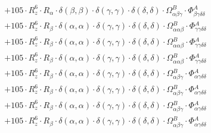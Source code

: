 \documentclass{article}
\begin{document}
\begin{subequations}
\begin{gather}
\begin{array}{c}
 \\[0.2em] 		 + 105 \cdot R_{z}^{6} \cdot R_{\alpha{}} \cdot \delta{}\left(\beta{}, \beta{}\right) \cdot \delta{}\left(\gamma{}, \gamma{}\right) \cdot \delta{}\left(\delta{}, \delta{}\right) \cdot \Omega{}^{B}_{\alpha{}\beta{}\gamma{}} \cdot \Phi{}^{A}_{\beta{}\gamma{}\delta{}\delta{}} 
 \\[0.2em] 		 + 105 \cdot R_{z}^{6} \cdot R_{\beta{}} \cdot \delta{}\left(\alpha{}, \alpha{}\right) \cdot \delta{}\left(\gamma{}, \gamma{}\right) \cdot \delta{}\left(\delta{}, \delta{}\right) \cdot \Omega{}^{B}_{\alpha{}\alpha{}\beta{}} \cdot \Phi{}^{A}_{\gamma{}\gamma{}\delta{}\delta{}} 
 \\[0.2em] 		 + 105 \cdot R_{z}^{6} \cdot R_{\beta{}} \cdot \delta{}\left(\alpha{}, \alpha{}\right) \cdot \delta{}\left(\gamma{}, \gamma{}\right) \cdot \delta{}\left(\delta{}, \delta{}\right) \cdot \Omega{}^{B}_{\alpha{}\alpha{}\beta{}} \cdot \Phi{}^{A}_{\gamma{}\gamma{}\delta{}\delta{}} 
 \\[0.2em] 		 + 105 \cdot R_{z}^{6} \cdot R_{\beta{}} \cdot \delta{}\left(\alpha{}, \alpha{}\right) \cdot \delta{}\left(\gamma{}, \gamma{}\right) \cdot \delta{}\left(\delta{}, \delta{}\right) \cdot \Omega{}^{B}_{\alpha{}\alpha{}\beta{}} \cdot \Phi{}^{A}_{\gamma{}\gamma{}\delta{}\delta{}} 
 \\[0.2em] 		 + 105 \cdot R_{z}^{6} \cdot R_{\beta{}} \cdot \delta{}\left(\alpha{}, \alpha{}\right) \cdot \delta{}\left(\gamma{}, \gamma{}\right) \cdot \delta{}\left(\delta{}, \delta{}\right) \cdot \Omega{}^{B}_{\alpha{}\beta{}\gamma{}} \cdot \Phi{}^{A}_{\alpha{}\gamma{}\delta{}\delta{}} 
 \\[0.2em] 		 + 105 \cdot R_{z}^{6} \cdot R_{\beta{}} \cdot \delta{}\left(\alpha{}, \alpha{}\right) \cdot \delta{}\left(\gamma{}, \gamma{}\right) \cdot \delta{}\left(\delta{}, \delta{}\right) \cdot \Omega{}^{B}_{\alpha{}\beta{}\gamma{}} \cdot \Phi{}^{A}_{\alpha{}\gamma{}\delta{}\delta{}} 
 \\[0.2em] 		 + 105 \cdot R_{z}^{6} \cdot R_{\beta{}} \cdot \delta{}\left(\alpha{}, \alpha{}\right) \cdot \delta{}\left(\gamma{}, \gamma{}\right) \cdot \delta{}\left(\delta{}, \delta{}\right) \cdot \Omega{}^{B}_{\alpha{}\beta{}\gamma{}} \cdot \Phi{}^{A}_{\alpha{}\gamma{}\delta{}\delta{}} 
 \\[0.2em] 		 + 105 \cdot R_{z}^{6} \cdot R_{\beta{}} \cdot \delta{}\left(\alpha{}, \alpha{}\right) \cdot \delta{}\left(\gamma{}, \gamma{}\right) \cdot \delta{}\left(\delta{}, \delta{}\right) \cdot \Omega{}^{B}_{\alpha{}\beta{}\gamma{}} \cdot \Phi{}^{A}_{\alpha{}\gamma{}\delta{}\delta{}} 

\end{array}
\end{gather}
\end{subequations}
\end{document}
